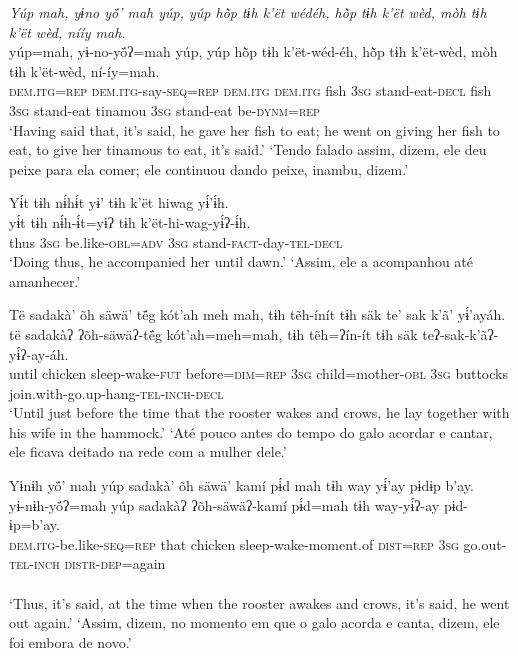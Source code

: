 \documentclass[output=paper,
modfonts,nonflat
]{langsci/langscibook}
\begin{document}
\newpage
\ea  \textit{Yúp mah, yɨno yö́’ mah yúp, yúp hõ̀p tɨh k’ët wédéh, hõ̀p tɨh k’ët wèd, mòh tɨh k’ët wèd, nííy mah.}\\ 
\gll yúp=mah, yɨ-no-yö́ʔ=mah yúp, yúp hõ̀p tɨh k’ët-wéd-éh,{\footnotemark} hõ̀p tɨh k’ët-wèd, mòh tɨh k’ët-wèd, ní-íy=mah.\\
     \textsc{dem.itg=rep} \textsc{dem.itg-}say\textsc{-seq=rep} \textsc{dem.itg} \textsc{dem.itg} fish \textsc{3sg} stand-eat\textsc{-decl} fish \textsc{3sg} stand-eat tinamou \textsc{3sg} stand-eat be\textsc{-dynm=rep}\\
\glt ‘Having said that, it’s said, he gave her fish to eat; he went on giving her fish to eat, to give her tinamous to eat, it’s said.'
\glt ‘Tendo falado assim, dizem, ele deu peixe para ela comer; ele continuou dando peixe, inambu, dizem.'
\z 
{} 

\ea  Yɨ́t tɨh nɨ́hɨ́t yɨ’ tɨh k’ët hiwag yɨ́’ɨ́h.\\ 
\gll yɨ́t tɨh nɨ́h-ɨ́t=yɨʔ tɨh k’ët-hi-wag-yɨ́ʔ-ɨ́h.\\
     thus \textsc{3sg} be.like\textsc{-obl=adv} \textsc{3sg} stand\textsc{-fact-}day\textsc{-tel-decl}\\
\glt ‘Doing thus, he accompanied her until dawn.'
\glt ‘Assim, ele a acompanhou até amanhecer.'
\z 

\ea  Të sadakà’ õh säwä’ të́g kót’ah meh mah, tɨh tẽh-ínít tɨh säk te’ sak k’ã’ yɨ́’ayáh.\\ 
\gll të sadakàʔ ʔõh-säwäʔ-të́g kót’ah=meh=mah, tɨh tẽh=ʔín-ít tɨh säk teʔ-sak-k’ãʔ-yɨ́ʔ-ay-áh.\\
     until chicken sleep-wake\textsc{-fut} before\textsc{=dim=rep} \textsc{3sg} child=mother\textsc{-obl} \textsc{3sg} buttocks join.with-go.up-hang\textsc{-tel-inch-decl}\\
\glt ‘Until just before the time that the rooster wakes and crows, he lay together with his wife in the hammock.'
\glt ‘Até pouco antes do tempo do galo acordar e cantar, ele ficava deitado na rede com a mulher dele.'
\z 

\newpage
\ea  Yɨnɨh yö́’ mah yúp sadakà’ õh säwä’ kamí pɨ́d mah tɨh way yɨ́’ay pɨdɨp b’ay.\\ 
\gll yɨ-nɨh-yö́ʔ=mah yúp sadakàʔ ʔõh-säwäʔ-kamí pɨ́d=mah tɨh way-yɨ́ʔ-ay pɨd-ɨp=b’ay.\\
     \textsc{dem.itg-}be.like\textsc{-seq=rep} that chicken sleep-wake-moment.of \textsc{dist=rep} \textsc{3sg} go.out\textsc{-tel-inch} \textsc{distr-dep}=again\\\\
\glt ‘Thus, it’s said, at the time when the rooster awakes and crows, it’s said, he went out again.'
\glt ‘Assim, dizem, no momento em que o galo acorda e canta, dizem, ele foi embora de novo.'
\z 
\end{document}

